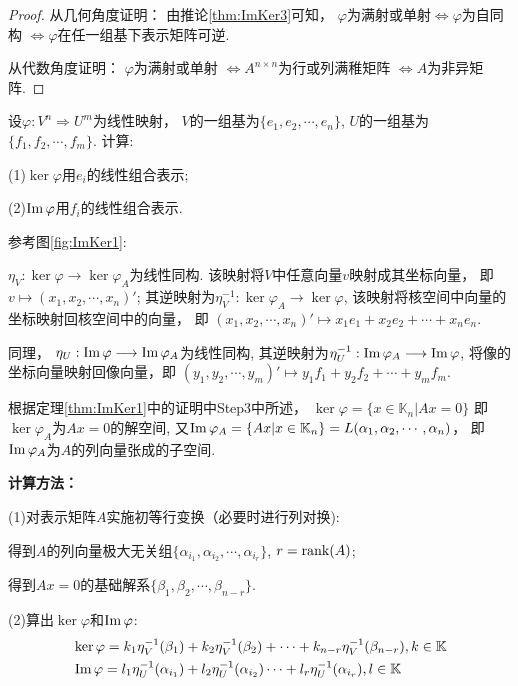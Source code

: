 \begin{proof}
  从几何角度证明：
  由推论\ref{thm:ImKer3}可知，
  $\varphi$为满射或单射$\Longleftrightarrow \varphi$为自同构
  $\Longleftrightarrow \varphi$在任一组基下表示矩阵可逆.

  从代数角度证明：
  $\varphi$为满射或单射 $\Longleftrightarrow A^{n \times n}$为行或列满稚矩阵
  $\Longleftrightarrow A$为非异矩阵. 
\end{proof}

\begin{example}
  设$\varphi: V^n \Longrightarrow U^m$为线性映射，
  $V$的一组基为$\{e_1, e_2,\cdots,e_n\}$,
  $U$的一组基为$\{f_1, f_2,\cdots,f_m\}$.
  计算:

  (1)$\ker\varphi$用$e_i$的线性组合表示;

  (2)$\operatorname{Im}\varphi$用$f_i$的线性组合表示. 
\end{example}

\begin{solution}
  参考图\ref{fig:ImKer1}:
  
  $\eta_V: \ker\varphi \longrightarrow \ker\varphi_A$为线性同构.
  该映射将$V$中任意向量$v$映射成其坐标向量， 即
  $v \mapsto (x_1, x_2,\cdots,x_n)'$; 
  其逆映射为$\eta_V^{-1}: \ker\varphi_A \longrightarrow \ker\varphi$,
  该映射将核空间中向量的坐标映射回核空间中的向量， 即
  $(x_1, x_2, \cdots, x_n)' \mapsto x_1e_1 + x_2e_2+ \cdots + x_ne_n$. 

  同理， $\eta_U: \operatorname{Im}\varphi \longrightarrow \operatorname{Im}\varphi_A$为线性同构,
  其逆映射为$\eta_U^{-1}: \operatorname{Im}\varphi_A \longrightarrow \operatorname{Im}\varphi$, 
  将像的坐标向量映射回像向量，即
  $(y_1, y_2, \cdots, y_m)' \mapsto y_1f_1 + y_2f_2+ \cdots + y_mf_m$.

  根据定理\ref{thm:ImKer1}中的证明中Step3中所述，
  $\ker\varphi =\{x \in \mathbb{K}_n|Ax=0\}$
  即$\ker\varphi_A$为$Ax = 0$的解空间,
  又$\operatorname{Im}\varphi_A = \{Ax|x \in \mathbb{K}_n\}
  = L(\alpha_1, \alpha_2, \cdots, \alpha_n)$， 即
  $\operatorname{Im}\varphi_A$为$A$的列向量张成的子空间.

  \textbf{计算方法：}

  (1)对表示矩阵$A$实施初等行变换（必要时进行列对换):
  
  得到$A$的列向量极大无关组$\{\alpha_{i_1},\alpha_{i_2},\cdots,\alpha_{i_r}\}$,
  $r = \operatorname{rank}(A)$;

  得到$Ax=0$的基础解系$\{\beta_1,\beta_2,\cdots,\beta_{n-r}\}$.
  
  (2)算出$\ker\varphi$和$\operatorname{Im}\varphi$: 
  \begin{align*}
       & \ker\varphi = k_1\eta_V^{-1}(\beta_1)+k_2\eta_V^{-1}(\beta_2)
         +\cdots+k_{n-r}\eta_V^{-1}(\beta_{n-r}), k \in \mathbb{K}\\
       & \operatorname{Im}\varphi = l_1\eta_U^{-1}(\alpha_{i_1})+l_2\eta_U^{-1}(\alpha_{i_2})
         \cdots+l_r\eta_U^{-1}(\alpha_{i_r}), l \in \mathbb{K}      
   \end{align*} 
 \end{solution}

